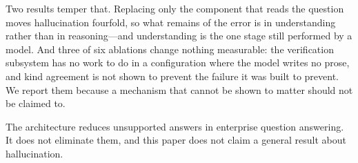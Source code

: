 \documentclass[11pt]{article}
\begin{document}
Two results temper that. Replacing only the component that reads the question moves
hallucination fourfold, so what remains of the error is in understanding rather than in
reasoning---and understanding is the one stage still performed by a model. And three of
six ablations change nothing measurable: the verification subsystem has no work to do in
a configuration where the model writes no prose, and kind agreement is not shown to
prevent the failure it was built to prevent. We report them because a mechanism that
cannot be shown to matter should not be claimed to.

The architecture reduces unsupported answers in enterprise question answering. It does
not eliminate them, and this paper does not claim a general result about hallucination.



\end{document}
